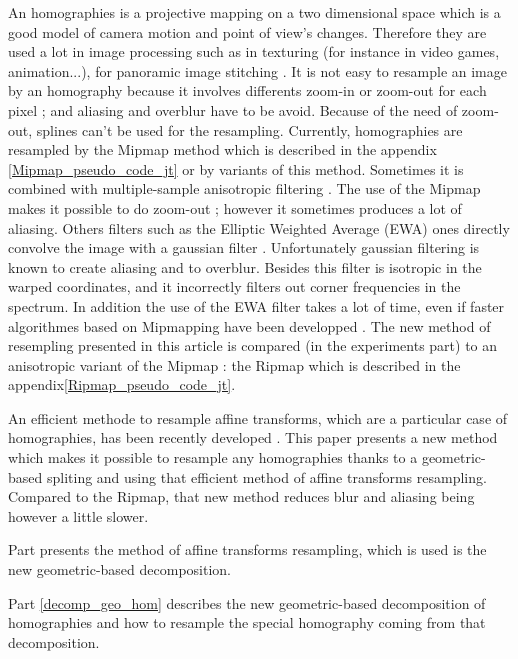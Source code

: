 
An homographies is a projective mapping on a two dimensional space which is a good model of camera motion and point of view's changes. Therefore they are used a lot in image processing such as in texturing \cite{heckbert1983texture} (for instance in video games, animation...), for panoramic image stitching \cite{brown2007automatic}. It is not easy to resample an image by an homography because it involves differents zoom-in or zoom-out for each pixel ; and aliasing and overblur have to be avoid. Because of the need of zoom-out, splines can't be used for the resampling. Currently, homographies are resampled by the Mipmap method \cite{williams1983pyramidal} which is described in the appendix \ref{Mipmap_pseudo_code_jt} or by variants of this method. Sometimes it is combined with multiple-sample anisotropic filtering  \cite{barkans1997high}. The use of the Mipmap makes it possible to do zoom-out ; however it sometimes produces a lot of aliasing. Others filters such as the Elliptic Weighted Average (EWA) ones directly convolve the image with a gaussian filter \cite{greene1986creating}. Unfortunately gaussian filtering is known to create aliasing and to overblur. Besides this filter is isotropic in the warped coordinates, and it incorrectly filters out corner frequencies in the spectrum. In addition the use of the EWA filter takes a lot of time, even if faster algorithmes based on Mipmapping have been developped \cite{mccormack1999feline,huttner1999fast}. The new method of resempling presented in this article is compared (in the experiments part) to an anisotropic variant of the Mipmap : the Ripmap \cite{akenine2008real} which is described in the appendix\ref{Ripmap_pseudo_code_jt}.

	An efficient methode to resample affine transforms, which are a particular case of homographies, has been recently developed \cite{szeliski2010high}. This paper presents a new method which makes it possible to resample any homographies thanks to a geometric-based spliting and using that efficient method of affine transforms resampling. Compared to the Ripmap, that new method reduces blur and aliasing being however a little slower. 
	
	Part \label{szeliski_section} presents the method of affine transforms resampling, which is used is the new geometric-based decomposition.
	
	Part \ref{decomp_geo_hom} describes the new geometric-based decomposition of homographies and how to resample the special homography coming from that decomposition.
	
